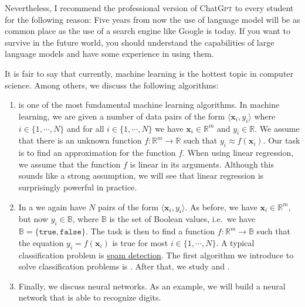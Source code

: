 \begin{enumerate}
      Nevertheless, I recommend the professional version of Chat\textsc{Gpt} to every student for the 
      following reason:  Five years from now the use of language model will be as common place as the use of a
      search engine like Google is today.  If you want to survive in the future world, you should understand
      the capabilities of large language models and have some experience in using them.  
      
      It is fair to say that currently, machine learning is the hottest topic in computer science.
      Among others, we discuss the following algorithms:
      \begin{enumerate}
      \item {} is one of the most fundamental machine learning algorithms.
            In machine learning, we are given a number of data pairs of the form  $\langle \mathbf{x}_i, y_i \rangle$ 
            where $i \in \{1,\cdots,N\}$ and for all $i \in \{1,\cdots,N\}$ we have $\mathbf{x}_i \in \mathbb{R}^m$
            and $y_i \in \mathbb{R}$.  We assume that there is an unknown function $f:\mathbb{R}^m \rightarrow \mathbb{R}$
            such that $y_i \approx f(\mathbf{x}_i)$.  Our task is to find an approximation for the function
            $f$.  When using linear regression, we assume that the function $f$ is linear in its arguments.
            Although this sounds like a strong assumption, we will see that linear regression is surprisingly
            powerful in practice.
      \item In a  we again have $N$ pairs of the form $\langle \mathbf{x}_i, y_i
        \rangle$.
            As before,  we have $\mathbf{x}_i \in \mathbb{R}^m$, but now $y_i \in \mathbb{B}$, where
            $\mathbb{B}$ is the set of Boolean values, i.e.~we have $\mathbb{B} = \{\mathtt{true}, \mathtt{false}\}$.
            The task is then to find a function $f:\mathbb{R}^m \rightarrow \mathbb{B}$
            such that the equation $y_i = f(\mathbf{x}_i)$ is true for most $i\in\{1,\cdots,N\}$.  A typical
            classification problem is \href{https://en.wikipedia.org/wiki/Email_spam}{spam detection}.  The
            first algorithm we introduce to solve classification problems is .
            After that, we study  and .
      \item Finally, we discuss neural networks.  As an example, we will build a neural network that is able to
            recognize digits. 
      \end{enumerate}
\end{enumerate}

